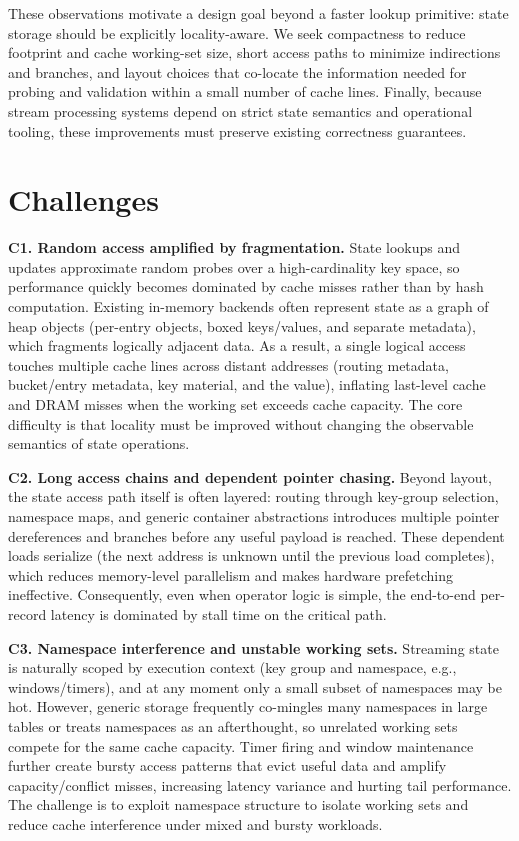 \documentclass[sigconf]{acmart}
\begin{document}
These observations motivate a design goal beyond a faster lookup primitive: state storage should be explicitly locality-aware.
We seek compactness to reduce footprint and cache working-set size, short access paths to minimize indirections and branches, and layout choices that co-locate the information needed for probing and validation within a small number of cache lines.
Finally, because stream processing systems depend on strict state semantics and operational tooling, these improvements must preserve existing correctness guarantees.

\section{Challenges}
\label{sec:challenges}
\textbf{C1. Random access amplified by fragmentation.}
State lookups and updates approximate random probes over a high-cardinality key space, so performance quickly becomes dominated by cache misses rather than by hash computation.
Existing in-memory backends often represent state as a graph of heap objects (per-entry objects, boxed keys/values, and separate metadata), which fragments logically adjacent data.
As a result, a single logical access touches multiple cache lines across distant addresses (routing metadata, bucket/entry metadata, key material, and the value), inflating last-level cache and DRAM misses when the working set exceeds cache capacity.
The core difficulty is that locality must be improved without changing the observable semantics of state operations.

\textbf{C2. Long access chains and dependent pointer chasing.}
Beyond layout, the state access path itself is often layered: routing through key-group selection, namespace maps, and generic container abstractions introduces multiple pointer dereferences and branches before any useful payload is reached.
These dependent loads serialize (the next address is unknown until the previous load completes), which reduces memory-level parallelism and makes hardware prefetching ineffective.
Consequently, even when operator logic is simple, the end-to-end per-record latency is dominated by stall time on the critical path.

\textbf{C3. Namespace interference and unstable working sets.}
Streaming state is naturally scoped by execution context (key group and namespace, e.g., windows/timers), and at any moment only a small subset of namespaces may be hot.
However, generic storage frequently co-mingles many namespaces in large tables or treats namespaces as an afterthought, so unrelated working sets compete for the same cache capacity.
Timer firing and window maintenance further create bursty access patterns that evict useful data and amplify capacity/conflict misses, increasing latency variance and hurting tail performance.
The challenge is to exploit namespace structure to isolate working sets and reduce cache interference under mixed and bursty workloads.
\end{document}
